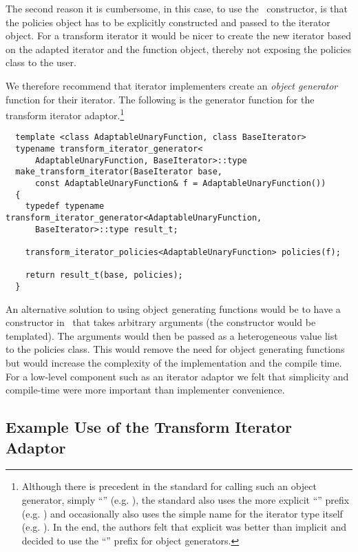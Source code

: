 \documentclass{netobjectdays}
\newcommand{\iteratoradaptor}{\code{iterator\_\-adaptor}}
\begin{document}
The second reason it is cumbersome, in this case, to use the
\iteratoradaptor\ constructor, is that the policies object has to be
explicitly constructed and passed to the iterator object.  For a
transform iterator it would be nicer to create the new iterator based
on the adapted iterator and the function object, thereby not exposing
the policies class to the user.

We therefore recommend that iterator implementers create an
\emph{object generator} function for their iterator. The following is
the generator function for the transform iterator adaptor.\footnote{
Although there is precedent in the standard for calling such an object
generator, simply ``''
(e.g. ), the standard also uses the more
explicit ``'' prefix (e.g. ) and
occasionally also uses the simple name for the iterator type itself
(e.g. ).  In the end, the authors felt
that explicit was better than implicit and decided to use the
``'' prefix for object generators.  }

{\footnotesize
\begin{verbatim}
  template <class AdaptableUnaryFunction, class BaseIterator>
  typename transform_iterator_generator<
      AdaptableUnaryFunction, BaseIterator>::type
  make_transform_iterator(BaseIterator base,
      const AdaptableUnaryFunction& f = AdaptableUnaryFunction())
  {
    typedef typename transform_iterator_generator<AdaptableUnaryFunction,
      BaseIterator>::type result_t;

    transform_iterator_policies<AdaptableUnaryFunction> policies(f);

    return result_t(base, policies);
  }
\end{verbatim}
}

An alternative solution to using object generating functions would be
to have a constructor in \iteratoradaptor\ that takes arbitrary
arguments (the constructor would be templated). The arguments would
then be passed as a heterogeneous value list~\cite{TMPW00:Eisenecker}
to the policies class. This would remove the need for object
generating functions but would increase the complexity of the
implementation and the compile time. For a low-level component such as
an iterator adaptor we felt that simplicity and compile-time were more
important than implementer convenience.

\subsection{Example Use of the Transform Iterator Adaptor}
\end{document}
